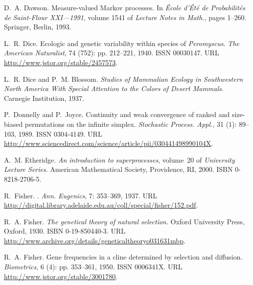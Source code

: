 \documentclass[10pt,letterpaper]{article}
\begin{document}
\begin{thebibliography}{68}
D.~A. Dawson.
\newblock Measure-valued {Markov} processes.
\newblock In \emph{École d'Été de Probabilités de Saint-Flour XXI---1991},
  volume 1541 of \emph{Lecture Notes in Math.}, pages 1--260. Springer, Berlin,
  1993.

L.~R. Dice.
\newblock Ecologic and genetic variability within species of
  \textit{{Peromyscus}}.
\newblock \emph{The American Naturalist}, 74 (752): pp.
  212--221, 1940.
\newblock ISSN 00030147.
\newblock URL \url{http://www.jstor.org/stable/2457573}.

L.~R. Dice and P.~M. Blossom.
\newblock \emph{Studies of Mammalian Ecology in Southwestern North America With
  Special Attention to the Colors of Desert Mammals}.
\newblock Carnegie Institution, 1937.

P.~Donnelly and P.~Joyce.
\newblock Continuity and weak convergence of ranked and size-biased
  permutations on the infinite simplex.
\newblock \emph{Stochastic Process. Appl.}, 31 (1): 89--103,
  1989.
\newblock ISSN 0304-4149.
\newblock URL
  \url{http://www.sciencedirect.com/science/article/pii/030441498990104X}.

A.~M. Etheridge.
\newblock \emph{An introduction to superprocesses}, volume~20 of
  \emph{University Lecture Series}.
\newblock American Mathematical Society, Providence, RI, 2000.
\newblock ISBN 0-8218-2706-5.

R.~Fisher.
.
\newblock \emph{Ann. Eugenics}, 7: 353--369, 1937.
\newblock URL
  \url{http://digital.library.adelaide.edu.au/coll/special/fisher/152.pdf}.

R.~A. Fisher.
\newblock \emph{The genetical theory of natural selection}.
\newblock Oxford University Press, Oxford, 1930.
\newblock ISBN 0-19-850440-3.
\newblock URL \url{http://www.archive.org/details/geneticaltheoryo031631mbp}.

R.~A. Fisher.
\newblock Gene frequencies in a cline determined by selection and diffusion.
\newblock \emph{Biometrics}, 6 (4): pp. 353--361, 1950.
\newblock ISSN 0006341X.
\newblock URL \url{http://www.jstor.org/stable/3001780}.


\end{thebibliography}
\end{document}
